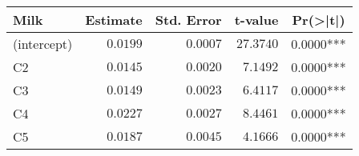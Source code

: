 \begin{table}[!tbp]
\begin{center}
\begin{tabular}{lrrrr}
\hline\hline
\multicolumn{1}{l}{Milk}&\multicolumn{1}{c}{Estimate}&\multicolumn{1}{c}{Std. Error}&\multicolumn{1}{c}{t-value}&\multicolumn{1}{c}{Pr(\textgreater |t|)}\tabularnewline
\hline
(intercept)&$0.0199$&$0.0007$&$27.3740$&$0.0000$***\tabularnewline
C2&$0.0145$&$0.0020$&$ 7.1492$&$0.0000$***\tabularnewline
C3&$0.0149$&$0.0023$&$ 6.4117$&$0.0000$***\tabularnewline
C4&$0.0227$&$0.0027$&$ 8.4461$&$0.0000$***\tabularnewline
C5&$0.0187$&$0.0045$&$ 4.1666$&$0.0000$***\tabularnewline
\hline
\end{tabular}\end{center}

\end{table}
